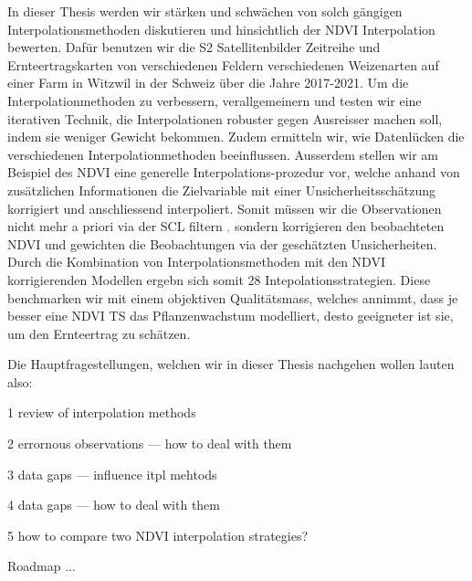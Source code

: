 In dieser Thesis werden wir stärken und schwächen von solch gängigen Interpolationsmethoden diskutieren und hinsichtlich der NDVI Interpolation bewerten. Dafür benutzen wir die S2 Satellitenbilder Zeitreihe und Ernteertragskarten von verschiedenen Feldern verschiedenen Weizenarten auf einer Farm in Witzwil in der Schweiz über die Jahre 2017-2021.
Um die Interpolationmethoden zu verbessern, verallgemeinern und testen wir eine iterativen Technik, die Interpolationen robuster gegen Ausreisser machen soll, indem sie weniger Gewicht bekommen. Zudem ermitteln wir, wie Datenlücken die verschiedenen Interpolationmethoden beeinflussen. Ausserdem stellen wir am Beispiel des NDVI eine generelle Interpolations-prozedur vor, welche anhand von zusätzlichen Informationen die Zielvariable mit einer Unsicherheitsschätzung korrigiert und anschliessend interpoliert. Somit müssen wir die Observationen nicht mehr a priori via der SCL filtern \textcolor{gray}, sondern korrigieren den beobachteten NDVI und gewichten die Beobachtungen via der geschätzten Unsicherheiten. Durch die Kombination von Interpolationsmethoden mit den NDVI korrigierenden Modellen ergebn sich somit 28 Intepolationsstrategien. Diese benchmarken wir mit einem objektiven Qualitätsmass, welches annimmt, dass je besser eine NDVI TS das Pflanzenwachstum modelliert, desto geeigneter ist sie, um den Ernteertrag zu schätzen. 

Die Hauptfragestellungen, welchen wir in dieser Thesis nachgehen wollen lauten also:
\begin{Nenumerate}
    \item 1 review of interpolation methods
    \item 2 errornous observations --- how to deal with them
    \item 3 data gaps --- influence itpl mehtods 
    \item 4 data gaps --- how to deal with them
    \item 5 how to compare two NDVI interpolation strategies?
\end{Nenumerate}

Roadmap ...









